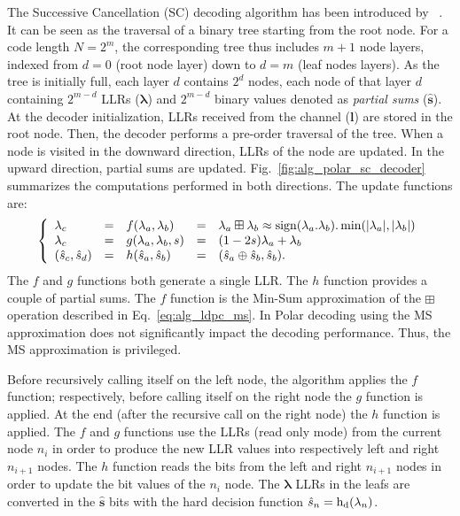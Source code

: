 The Successive Cancellation (SC) decoding algorithm has been introduced by
\Arikan~\cite{Arikan2009}. It can be seen as the traversal of a binary tree
starting from the root node. For a code length $N=2^m$, the corresponding tree
thus includes $m + 1$ node layers, indexed from $d=0$ (root node layer) down to
$d=m$ (leaf nodes layers). As the tree is initially full, each layer $d$
contains $2^d$ nodes, each node of that layer $d$ containing $2^{m-d}$ LLRs
($\bm{\lambda}$) and $2^{m-d}$ binary values denoted as \textit{partial sums}
($\bm{\hat{s}}$). At the decoder initialization, LLRs received from the channel
($\bm{l}$) are stored in the root node. Then, the decoder performs a pre-order
traversal of the tree. When a node is visited in the downward direction, LLRs of
the node are updated. In the upward direction, partial sums are updated.
Fig.~\ref{fig:alg_polar_sc_decoder} summarizes the computations performed in
both directions. The update functions are:
\begin{eqnarray}
\left\{\begin{array}{l c l c l}
\lambda_c &=& f(\lambda_a,\lambda_b) &=& \lambda_a \boxplus \lambda_b \approx \operatorname*{sign}(\lambda_a.\lambda_b).\min(|\lambda_a|,|\lambda_b|)\\
\lambda_c &=& g(\lambda_a,\lambda_b,s)&=&(1-2s)\lambda_a+\lambda_b\\
(\hat{s}_{c}, \hat{s}_{d}) &=& h(\hat{s}_{a}, \hat{s}_{b}) &=& (\hat{s}_{a} \oplus \hat{s}_{b}, \hat{s}_{b}).
\end{array}\right.
\label{eq:alg_polar_f_g_h}
\end{eqnarray}
The $f$ and $g$ functions both generate a single LLR. The $h$ function provides
a couple of partial sums. The $f$ function is the Min-Sum approximation of the
$\boxplus$ operation described in Eq.~\ref{eq:alg_ldpc_ms}. In Polar decoding
using the MS approximation does not significantly impact the decoding
performance. Thus, the MS approximation is privileged.

Before recursively calling itself on the left node, the algorithm applies the
$f$ function; respectively, before calling itself on the right node the $g$
function is applied. At the end (after the recursive call on the right node) the
$h$ function is applied. The $f$ and $g$ functions use the LLRs (read only mode)
from the current node $n_i$ in order to produce the new LLR values into
respectively left and right $n_{i+1}$ nodes. The $h$ function reads the bits
from the left and right $n_{i+1}$ nodes in order to update the bit values of the
$n_i$ node. The $\bm{\lambda}$ LLRs in the leafs are converted in the
$\bm{\hat{s}}$ bits with the hard decision function $\hat{s}_n =
\operatorname{h_d}(\lambda_n)$.

